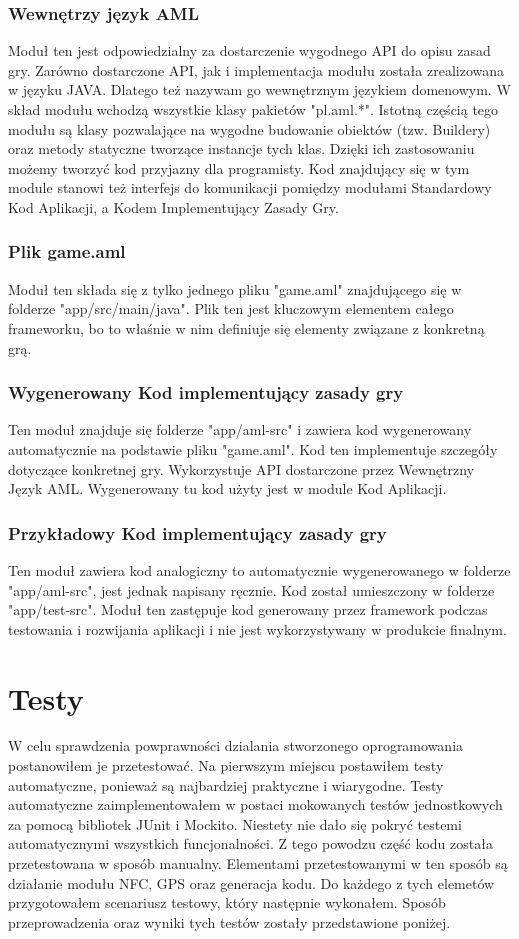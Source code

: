 \documentclass	{xmgr}
\begin{document}
\subsection{Wewnętrzy język AML}
Moduł ten jest odpowiedzialny za dostarczenie wygodnego API do opisu zasad gry. Zarówno dostarczone API, jak i implementacja modułu została zrealizowana w języku JAVA. Dlatego też nazywam go wewnętrznym językiem domenowym. W skład modułu wchodzą wszystkie klasy pakietów "pl.aml.*".
Istotną częścią tego modułu są klasy pozwalające na wygodne budowanie obiektów (tzw. Buildery) oraz metody statyczne tworzące instancje tych klas. Dzięki ich zastosowaniu możemy tworzyć kod przyjazny dla programisty. Kod znajdujący się w tym module stanowi też interfejs do komunikacji pomiędzy modułami Standardowy Kod Aplikacji, a Kodem Implementujący Zasady Gry.

\subsection{Plik game.aml}
Moduł ten składa się z tylko jednego pliku "game.aml" znajdującego się w folderze "app/src/main/java". Plik ten jest kluczowym elementem całego frameworku, bo to właśnie w nim definiuje się elementy związane z konkretną grą.

\subsection{Wygenerowany Kod implementujący zasady gry}
Ten moduł znajduje się folderze "app/aml-src" i zawiera kod wygenerowany automatycznie na podstawie pliku "game.aml". Kod ten implementuje szczegóły dotyczące konkretnej gry. Wykorzystuje API dostarczone przez Wewnętrzny Język AML. Wygenerowany tu kod użyty jest w module Kod Aplikacji.

\subsection{Przykładowy Kod implementujący zasady gry}
Ten moduł zawiera kod analogiczny to automatycznie wygenerowanego w folderze "app/aml-src", jest jednak napisany ręcznie. Kod został umieszczony w folderze "app/test-src". Moduł ten zastępuje kod generowany przez framework podczas testowania i rozwijania aplikacji i nie jest wykorzystywany w produkcie finalnym.

\chapter{Testy} 
W celu sprawdzenia powprawności dzialania stworzonego oprogramowania postanowiłem je przetestować. Na pierwszym miejscu postawiłem testy automatyczne, ponieważ są najbardziej praktyczne i wiarygodne. Testy automatyczne zaimplementowałem w postaci mokowanych testów jednostkowych za pomocą bibliotek JUnit i Mockito.
Niestety nie dało się pokryć testemi automatycznymi wszystkich funcjonalności. Z tego powodzu część kodu została przetestowana w sposób manualny. Elementami przetestowanymi w ten sposób są działanie modułu NFC, GPS oraz generacja kodu. Do każdego z tych elemetów przygotowałem scenariusz testowy, który następnie wykonałem. Sposób przeprowadzenia oraz wyniki tych testów zostały przedstawione poniżej.
\end{document}
